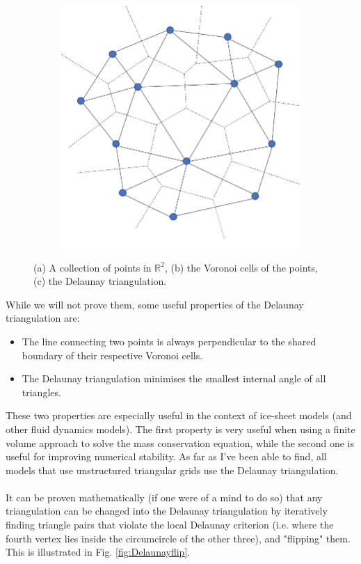 \documentclass{article}
\begin{document}
\begin{figure}[h!]
\begin{subfigure}[b]{0.25\linewidth}
    \caption{}
  \end{subfigure}
  \begin{subfigure}[b]{0.25\linewidth}
    \includegraphics[width=\linewidth]{Fig_VoronoiDelaunay_03.png}
    \caption{}
  \end{subfigure}
  \caption{(a) A collection of points in $\mathbb{R}^{2}$, (b) the Voronoi cells of the points, (c) the Delaunay triangulation.}
\end{figure}

While we will not prove them, some useful properties of the Delaunay triangulation are:

\begin{itemize}
  \item The line connecting two points is always perpendicular to the shared boundary of their respective Voronoi cells.
  \item The Delaunay triangulation minimises the smallest internal angle of all triangles.
\end{itemize}

These two properties are especially useful in the context of ice-sheet models (and other fluid dynamics models). The first property is very useful when using a finite volume approach to solve the mass conservation equation, while the second one is useful for improving numerical stability. As far as I've been able to find, all models that use unstructured triangular grids use the Delaunay triangulation.\\
\\
It can be proven mathematically (if one were of a mind to do so) that any triangulation can be changed into the Delaunay triangulation by iteratively finding triangle pairs that violate the local Delaunay criterion (i.e. where the fourth vertex lies inside the circumcircle of the other three), and "flipping" them. This is illustrated in Fig. \ref{fig:Delaunayflip}.
\end{document}
